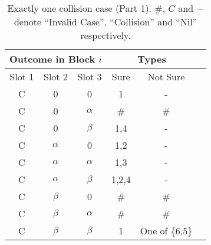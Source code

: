 \documentclass[fleqn]{article}
\begin{document}
\begin {table} 
\centering
\begin{tabular}{|c|c|c|c|c|c|} 
\hline
\multicolumn{3}{|c|}{Outcome in Block $i$} & \multicolumn{2}{c|}{Types} \\ \hline
Slot 1      & Slot 2        & Slot 3       & Sure    & Not Sure         \\ \hline
C           & 0             & 0            & 1       & -                \\ \hline
C           & 0             & $\alpha$     & \#      & \#               \\ \hline
C           & 0             & $\beta$      & 1,4     & -                \\ \hline
C           & $\alpha$      & 0            & 1,2     & -                \\ \hline
C           & $\alpha$      & $\alpha$     & 1,3     & -                \\ \hline
C           & $\alpha$      & $\beta$      & 1,2,4   & -                \\ \hline
C           & $\beta$       & 0            & \#      & \#               \\ \hline
C           & $\beta$       & $\alpha$     & \#      & \#               \\ \hline
C           & $\beta$       & $\beta$      & 1       & One of \{6,5\}   \\ \hline
\hline
\end{tabular}
\caption{Exactly one collision case (Part 1). \#, $C$ and $-$ denote ``Invalid Case'', ``Collision'' and  ``Nil'' respectively.}
\label{Tab_OneC1}
\end{table}
\end{document}
